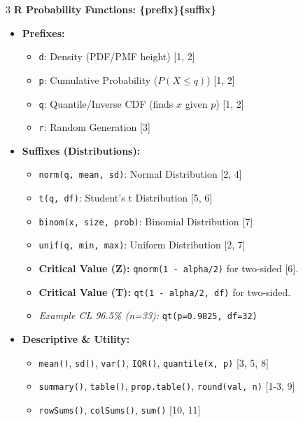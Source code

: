 \documentclass[10pt]{article}
\begin{document}
\begin{multicols}{3}
\textbf{R Probability Functions: \{prefix\}\{suffix\}}
\begin{itemize}
    \item \textbf{Prefixes:} 
    \begin{itemize}
        \item \texttt{d}: Density (PDF/PMF height) [1, 2]
        \item \texttt{p}: Cumulative Probability ($P(X \le q)$) [1, 2]
        \item \texttt{q}: Quantile/Inverse CDF (finds $x$ given $p$) [1, 2]
        \item \texttt{r}: Random Generation [3]
    \end{itemize}
    \item \textbf{Suffixes (Distributions):}
    \begin{itemize}
        \item \texttt{norm(q, mean, sd)}: Normal Distribution [2, 4]
        \item \texttt{t(q, df)}: Student's t Distribution [5, 6]
        \item \texttt{binom(x, size, prob)}: Binomial Distribution [7]
        \item \texttt{unif(q, min, max)}: Uniform Distribution [2, 7]
        \item \textbf{Critical Value (Z):} \texttt{qnorm(1 - alpha/2)} for two-sided [6].
        \item \textbf{Critical Value (T):} \texttt{qt(1 - alpha/2, df)} for two-sided.
        \item \textit{Example CL 96.5\% (n=33):} \texttt{qt(p=0.9825, df=32)}
    \end{itemize}
    \item \textbf{Descriptive \& Utility:}
    \begin{itemize}
        \item \texttt{mean()}, \texttt{sd()}, \texttt{var()}, \texttt{IQR()}, \texttt{quantile(x, p)} [3, 5, 8]
        \item \texttt{summary()}, \texttt{table()}, \texttt{prop.table()}, \texttt{round(val, n)} [1-3, 9]
        \item \texttt{rowSums()}, \texttt{colSums()}, \texttt{sum()} [10, 11]
    \end{itemize}
    
\end{itemize}

\end{multicols}
\end{document}
